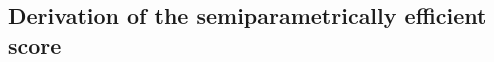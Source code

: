 \documentclass[11pt]{article}
\begin{document}
\newenvironment{assumptionB'}
  {\par\noindent
   \refstepcounter{assBnn}%
   A\textsc{ssumption }B'\theassBnn.~\itshape\ignorespaces}
  {\par\ignorespacesafterend}
  
\newenvironment{assumptionC'}
  {\par\noindent
   \refstepcounter{assCnn}%
   A\textsc{ssumption }C'\theassCnn.~\itshape\ignorespaces}
  {\par\ignorespacesafterend}
  


\newtheorem{innercustomgeneric}{\customgenericname}
\providecommand{\customgenericname}{}
\newcommand{\newcustomtheorem}[2]{%
  \newenvironment{#1}[1]
  {%
   \renewcommand\customgenericname{#2}%
   \renewcommand\theinnercustomgeneric{##1}%
   \innercustomgeneric
  }
  {\endinnercustomgeneric}
}




%

\subsection{Derivation of the semiparametrically efficient score}\label{derivation}
\end{document}
